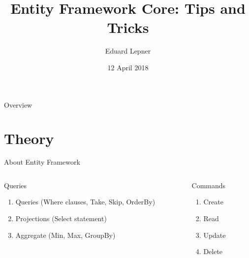 \documentclass{bredelebeamer}
\title[EFC Tips \& Tricks]{Entity Framework Core: Tips and Tricks}
\author{Eduard Lepner\inst{1}}
\institute[Powel]
{
  \inst{1}%
  Powel AS\\
  Team Leader at Powel Water
  }
\date{12 April 2018}
\begin{document}
\begin{frame}
  \titlepage
\end{frame}

\begin{frame}{Overview}
  \tableofcontents
\end{frame}

\section{Theory}
\begin{frame} {About Entity Framework}
    \begin{columns}[t]
        \begin{column}{0.5\textwidth}
            Queries\\[.2cm]
            \begin{enumerate}
                \item Queries (Where clauses, Take, Skip, OrderBy)
                \item Projections (Select statement)
                \item Aggregate (Min, Max, GroupBy)
            \end{enumerate}
            
        \end{column}
        \begin{column}{0.5\textwidth}
            Commands\\[.2cm]
            \begin{enumerate}
                \item Create
                \item Read
                \item Update
                \item Delete
            \end{enumerate}
        \end{column}
    \end{columns}
\end{frame}
\end{document}
